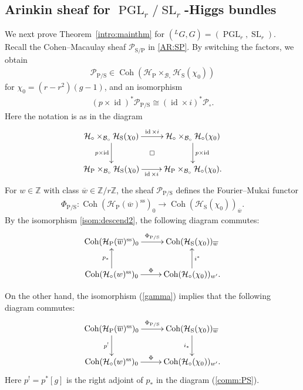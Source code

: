 \documentclass[11pt,oneside,a4paper,mathscr]{amsart}
\makeatletter
\theoremstyle{definition}
\newcommand{\cH}{\mathcal{H}}
\newcommand{\cB}{\mathcal{B}}
\newcommand{\cP}{\mathcal{P}}
\newcommand{\diasquare}{\ar@{}[rd]|\square}
\newcommand{\Coh}{\operatorname{Coh}}
\newcommand{\id}{\operatorname{id}}
\newcommand{\SL}{\operatorname{SL}}
\newcommand{\PGL}{\operatorname{PGL}}
\newcommand{\rS}{\mathrm{S}}
\newcommand{\rP}{\mathrm{P}}
\makeatother
\begin{document}
\subsection[Arinkin sheaf for PGLr/SLr-Higgs bundles]{Arinkin sheaf for \texorpdfstring{$\PGL_r/\SL_r$}{PGLr/SLr}-Higgs bundles}
We next prove Theorem~\ref{intro:mainthm} for $(^{L}G, G)=(\PGL_r, \SL_r)$. 
Recall the Cohen--Macaulay sheaf $\cP_{\rS/\rP}$ in \eqref{AR:SP}.
By switching the factors, we obtain
\begin{align*}
\cP_{\rP/\rS} \in \Coh(\cH_{\mathrm{P}} \times_{\cB_{\circ}} \cH_{\rS}(\chi_0))
\end{align*}
for $\chi_0=(r-r^2)(g-1)$,
and an isomorphism
\begin{align}\label{isom:descend2}
(p \times \id)^* \cP_{\rP/\rS}
\cong
(\id \times i)^* \cP_{\circ}.
\end{align}
Here the notation is as in the diagram
\begin{align*}
\xymatrix{
\cH_{\circ} \times_{\cB_{\circ}} \cH_{\rS}(\chi_0)
\ar[r]^-{\id \times i}
\ar[d]_-{p \times \id} \diasquare
&
\cH_{\circ} \times_{\cB_{\circ}} \cH_{\circ}(\chi_0)
\ar[d]^-{p \times \id}
\\
\cH_{\mathrm{P}} \times_{\cB_{\circ}} \cH_{\rS}(\chi_0)
\ar[r]_-{\id \times i}
&
\cH_{\mathrm{P}} \times_{\cB_{\circ}} \cH_{\circ}(\chi_0).
}
\end{align*}
For $w \in \mathbb{Z}$ with class
$\overline{w} \in \mathbb{Z}/r\mathbb{Z}$, the sheaf
$\cP_{\rP/\rS}$ defines the Fourier--Mukai functor
\begin{align}\label{Phi:PS}
\Phi_{\rP/\rS} \colon
\Coh(\cH_{\mathrm{P}}(\overline{w})^{\mathrm{ss}})_0
\to
\Coh(\cH_{\rS}(\chi_0))_{\overline{w}}.
\end{align}
By the isomorphism \eqref{isom:descend2}, the following diagram commutes:
\begin{align}\label{comm:PS}
\xymatrix{
\Coh(\cH_{\mathrm{P}}(\overline{w})^{\mathrm{ss}})_0
\ar[r]^-{\Phi_{\rP/\rS}}
&
\Coh(\cH_{\rS}(\chi_0))_{\overline{w}}
\\
\Coh(\cH_{\circ}(w)^{\mathrm{ss}})_0
\ar[r]^-{\Phi}
\ar[u]^-{p_*}
&
\Coh(\cH_{\circ}(\chi_0))_{w'}
\ar[u]_-{i^*}.
}
\end{align}

On the other hand, the isomorphism (\ref{gamma}) implies that the 
following diagram commutes: 
\begin{align}\label{comm:PS2}
\xymatrix{
\Coh(\cH_{\mathrm{P}}(\overline{w})^{\mathrm{ss}})_0
\ar[r]^-{\Phi_{\rP/\rS}} \ar[d]_-{p^!}
&
\Coh(\cH_{\rS}(\chi_0))_{\overline{w}} \ar[d]_-{i_{*}}
\\
\Coh(\cH_{\circ}(w)^{\mathrm{ss}})_0
\ar[r]^-{\Phi}
&
\Coh(\cH_{\circ}(\chi_0))_{w'}.
}
\end{align}
Here $p^!=p^{*}[g]$ is the right adjoint of $p_{*}$ in the diagram (\ref{comm:PS}). 
\end{document}
